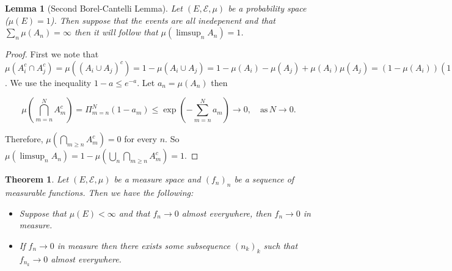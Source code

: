 \documentclass[
]{book}
\providecommand{\tightlist}{%
  \setlength{\itemsep}{0pt}\setlength{\parskip}{0pt}}
\newtheorem{theorem}{Theorem}[chapter]
\newtheorem{lemma}{Lemma}[chapter]
\theoremstyle{definition}
\theoremstyle{definition}
\theoremstyle{definition}
\theoremstyle{definition}
\theoremstyle{remark}
\begin{document}
\begin{lemma}[Second Borel-Cantelli Lemma]
Let \((E, \mathcal{E}, \mu)\) be a probability space (\(\mu(E) =1\)). Then suppose that the events are all inedepenent and that \(\sum_n \mu(A_n) = \infty\) then it will follow that \(\mu(\limsup_n A_n) =1\).
\end{lemma}

\begin{proof}
First we note that \(\mu(A_i^c \cap A_j^c) = \mu ((A_i \cup A_j)^c) = 1 - \mu(A_i \cup A_j) = 1 - \mu(A_i) - \mu(A_j)+ \mu(A_i)\mu(A_j) = (1-\mu(A_i))(1-\mu(A_j))\).
We use the inequality \(1-a \leq e^{-a}\). Let \(a_n = \mu(A_n)\) then

\[ \mu \left( \bigcap_{m=n}^N A_m^c \right) = \Pi_{m=n}^N (1-a_m) \leq \exp \left( - \sum_{m=n}^N a_m \right) \rightarrow 0, \quad \mbox{as}\, N \rightarrow 0. \]

Therefore, \(\mu \left( \bigcap_{m \geq n} A_m^c \right) = 0\) for every \(n\). So \(\mu(\limsup_n A_n ) = 1- \mu(\bigcup_n \bigcap_{m \geq n} A_m^c) = 1\).
\end{proof}

\begin{theorem}

Let \((E, \mathcal{E}, \mu)\) be a measure space and \((f_n)_n\) be a sequence of measurable functions. Then we have the following:

\begin{itemize}
\tightlist
\item
  Suppose that \(\mu(E) < \infty\) and that \(f_n \rightarrow 0\) almost everywhere, then \(f_n \rightarrow 0\) in measure.
\item
  If \(f_n \rightarrow 0\) in measure then there exists some subsequence \((n_k)_k\) such that \(f_{n_k} \rightarrow 0\) almost everywhere.
\end{itemize}

\end{theorem}
\end{document}

